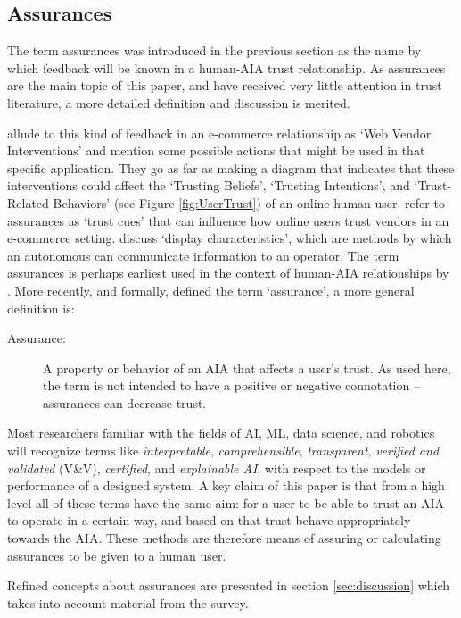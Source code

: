 \subsection{Assurances} \label{sec:assurances}
    The term assurances was introduced in the previous section as the name by which feedback will be known in a human-AIA trust relationship. As assurances are the main topic of this paper, and have received very little attention in trust literature, a more detailed definition and discussion is merited.

    \citet{McKnight2001-fa} allude to this kind of feedback in an e-commerce relationship as `Web Vendor Interventions' and mention some possible actions that might be used in that specific application. They go as far as making a diagram that indicates that these interventions could affect the `Trusting Beliefs', `Trusting Intentions', and `Trust-Related Behaviors' (see Figure \ref{fig:UserTrust}) of an online human user. \citet{Corritore2003-gx} refer to assurances as `trust cues' that can influence how online users trust vendors in an e-commerce setting. \citet{Lee2004-pv} discuss `display characteristics', which are methods by which an autonomous can communicate information to an operator. The term assurances is perhaps earliest used in the context of human-AIA relationships by \citet{Sheridan1984-kx}. More recently, and formally, \citet{Lillard2016-yg} defined the term `assurance', a more general definition is:    
    \begin{description}
        \item [Assurance:] A property or behavior of an AIA that affects a user's trust. As used here, the term is not intended to have a positive or negative connotation -- assurances can decrease trust.
    \end{description}

    Most researchers familiar with the fields of AI, ML, data science, and robotics will recognize terms like \emph{interpretable}, \emph{comprehensible}, \emph{transparent}, \emph{verified and validated} (V\&V), \emph{certified}, and \emph{explainable AI}, with respect to the models or performance of a designed system. A key claim of this paper is that from a high level all of these terms have the same aim: for a user to be able to trust an AIA to operate in a certain way, and based on that trust behave appropriately towards the AIA. These methods are therefore means of assuring or calculating assurances to be given to a human user.

    Refined concepts about assurances are presented in section \ref{sec:discussion} which takes into account material from the survey.
